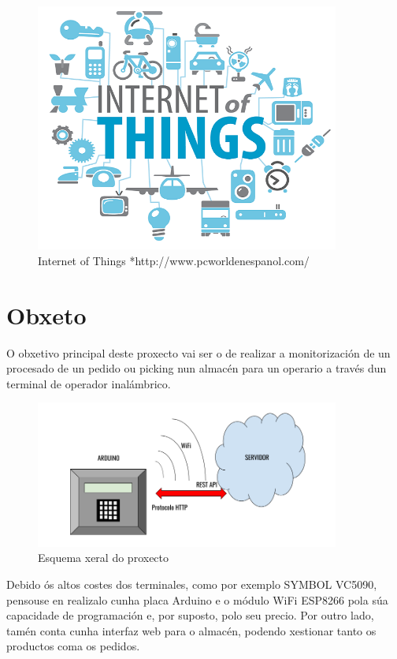 \documentclass[11pt,twoside]{book}
\begin{document}
\begin{figure}[H]
	\begin{center}
		\includegraphics[width=10cm]{images/IoT.png}
	\end{center}
	\caption{Internet of Things *http://www.pcworldenespanol.com/}
	\label{fig:IoT}
\end{figure}

\section{Obxeto}

O obxetivo principal deste proxecto vai ser o de realizar a monitorización de un procesado de un pedido ou picking nun almacén para un operario a través dun terminal de operador inalámbrico.

\begin{figure}[H]
	\begin{center}
		\includegraphics[width=10cm]{images/esquema_xeral.png}
	\end{center}
	\caption{Esquema xeral do proxecto}
	\label{fig:IoT}
\end{figure}

Debido ós altos costes dos terminales, como por exemplo SYMBOL VC5090, pensouse en realizalo cunha placa Arduino e o módulo WiFi ESP8266 pola súa capacidade de programación e, por suposto, polo seu precio.
Por outro lado, tamén conta cunha interfaz web para o almacén, podendo xestionar tanto os productos coma os pedidos.
\end{document}
